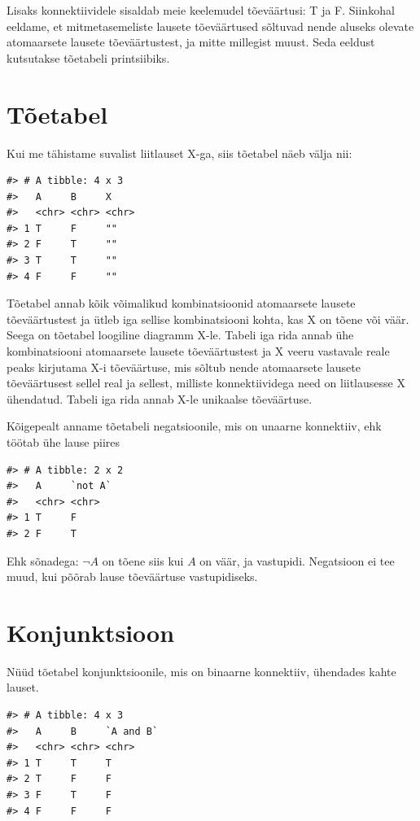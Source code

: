 \documentclass[]{book}
\begin{document}
Lisaks konnektiividele sisaldab meie keelemudel tõeväärtusi: T ja F.
Siinkohal eeldame, et mitmetasemeliste lausete tõeväärtused sõltuvad
nende aluseks olevate atomaarsete lausete tõeväärtustest, ja mitte
millegist muust. Seda eeldust kutsutakse tõetabeli printsiibiks.

\section{Tõetabel}\label{toetabel}

Kui me tähistame suvalist liitlauset X-ga, siis tõetabel näeb välja nii:

\begin{verbatim}
#> # A tibble: 4 x 3
#>   A     B     X    
#>   <chr> <chr> <chr>
#> 1 T     F     ""   
#> 2 F     T     ""   
#> 3 T     T     ""   
#> 4 F     F     ""
\end{verbatim}

Tõetabel annab kõik võimalikud kombinatsioonid atomaarsete lausete
tõeväärtustest ja ütleb iga sellise kombinatsiooni kohta, kas X on tõene
või väär. Seega on tõetabel loogiline diagramm X-le. Tabeli iga rida
annab ühe kombinatsiooni atomaarsete lausete tõeväärtustest ja X veeru
vastavale reale peaks kirjutama X-i tõeväärtuse, mis sõltub nende
atomaarsete lausete tõeväärtusest sellel real ja sellest, milliste
konnektiividega need on liitlausesse X ühendatud. Tabeli iga rida annab
X-le unikaalse tõeväärtuse.

Kõigepealt anname tõetabeli negatsioonile, mis on unaarne konnektiiv,
ehk töötab ühe lause piires

\begin{verbatim}
#> # A tibble: 2 x 2
#>   A     `not A`
#>   <chr> <chr>  
#> 1 T     F      
#> 2 F     T
\end{verbatim}

Ehk sõnadega: \(\neg A\) on tõene siis kui \(A\) on väär, ja vastupidi.
Negatsioon ei tee muud, kui põõrab lause tõeväärtuse vastupidiseks.

\section{Konjunktsioon}\label{konjunktsioon}

Nüüd tõetabel konjunktsioonile, mis on binaarne konnektiiv, ühendades
kahte lauset.

\begin{verbatim}
#> # A tibble: 4 x 3
#>   A     B     `A and B`
#>   <chr> <chr> <chr>    
#> 1 T     T     T        
#> 2 T     F     F        
#> 3 F     T     F        
#> 4 F     F     F
\end{verbatim}
\end{document}
